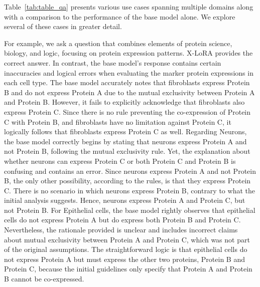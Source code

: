 Table~\ref{tab:table_qa} presents various use cases spanning multiple domains along with a comparison to the performance of the base model alone. We explore several of these cases in greater detail.

For example, we ask a question that combines elements of protein science, biology, and logic, focusing on protein expression patterns. X-LoRA provides the correct answer. In contrast, the base model's response contains certain inaccuracies and logical errors when evaluating the marker protein expressions in each cell type. The base model accurately notes that fibroblasts express Protein B and do not express Protein A due to the mutual exclusivity between Protein A and Protein B. However, it fails to explicitly acknowledge that fibroblasts also express Protein C. Since there is no rule preventing the co-expression of Protein C with Protein B, and fibroblasts have no limitation against Protein C, it logically follows that fibroblasts express Protein C as well. Regarding Neurons, the base model correctly begins by stating that neurons express Protein A and not Protein B, following the mutual exclusivity rule. Yet, the explanation about whether neurons can express Protein C or both Protein C and Protein B is confusing and contains an error. Since neurons express Protein A and not Protein B, the only other possibility, according to the rules, is that they express Protein C. There is no scenario in which neurons express Protein B, contrary to what the initial analysis suggests. Hence, neurons express Protein A and Protein C, but not Protein B. For Epithelial cells, the base model rightly observes that epithelial cells do not express Protein A but do express both Protein B and Protein C. Nevertheless, the rationale provided is unclear and includes incorrect claims about mutual exclusivity between Protein A and Protein C, which was not part of the original assumptions. The straightforward logic is that epithelial cells do not express Protein A but must express the other two proteins, Protein B and Protein C, because the initial guidelines only specify that Protein A and Protein B cannot be co-expressed.

